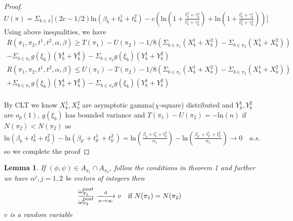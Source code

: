 \documentclass[aoas,preprint]{imsart}
\newtheorem{lemma}{Lemma}
\begin{document}
\begin{proof}
$U(\pi) = \Sigma_{b\in\pi}\big[(2c - 1/2) \text{ln}(\beta_b + t_b^1 + t_b^2) 
  - c(\text{ln}(1 + \frac{t_b^2 + \gamma_b^2}{t_b^1 + \gamma_b^1}) + \text{ln}(1 + \frac{t_b^1 + \gamma_b^1}{t_b^2 + \gamma_b^2}))\big]$\\
  
 Using above inequalities, we have 
 \begin{eqnarray*}
 R(\pi_1, \pi_2, t^1, t^2, \alpha, \beta)  \geq T(\pi_1) - U(\pi_2) - 1/8 (\Sigma_{b\in\pi_1}(X_b^1 + X_b^2) - \Sigma_{b\in\pi_2}(X_b^1 + X_b^2)) \\ 
 - \Sigma_{b\in\pi_1}g(\xi_b)(Y_b^1 + Y_b^2)  - \Sigma_{b\in\pi_2}g(\xi_ b)(Y_b^1 + Y_b^2)\\
  R(\pi_1, \pi_2, t^1, t^2, \alpha, \beta)  \leq U(\pi_1) - T(\pi_2) - 1/8 (\Sigma_{b\in\pi_1}(X_b^1 + X_b^2) - \Sigma_{b\in\pi_2}(X_b^1 + X_b^2)) \\ 
 + \Sigma_{b\in\pi_1}g(\xi_b)(Y_b^1 + Y_b^2)  - \Sigma_{b\in\pi_2}g(\xi_ b)(Y_b^1 + Y_b^2)\\
 \end{eqnarray*}
 
 By CLT we know $X_b^1, X_b^2$ are asymptotic gamma($\chi$-square) distributed and $Y_b^1, Y_b^2$ are $o_p(1)$, $g(\xi_b)$ has bounded variance and $T(\pi_1) - U(\pi_2) = -\text{ln}(n)$ if $N(\pi_2) < N(\pi_2)$
 as $ \text{ln}(\beta_b + t_b^1 + t_b^2)  -  \text{ln}(\beta_{b'} + t_{b'}^1 + t_{b'}^2) =  \text{ln}(\frac{\beta_b + t_b^1 + t_b^2}{n_1})  -  \text{ln}(\frac{\beta_{b'} + t_{b'}^1 + t_{b'}^2}{n_1}) \rightarrow 0 \quad a.s.$ so we complete the proof




\end{proof}


\begin{lemma}
 If $(\phi, \psi) \in A_{\pi_1} \cap A_{\pi_2}$, follow the conditions in theorem 1 and further we have $\alpha^j, j = 1,2$ be vectors of integers then 
\begin{eqnarray*}
 \frac{\omega_{\pi_1}^{\text post}}{\omega_{\pi_2}^{\text post}} \xrightarrow[n\rightarrow\infty]{\text{d}} v \quad \text{if } N(\pi_1) = N(\pi_2)\\
\end{eqnarray*}
$v$ is a random variable
\end{lemma}
\end{document}
